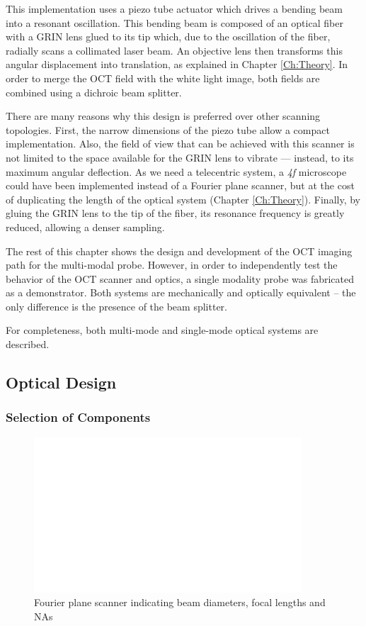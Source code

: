 This implementation uses a piezo tube actuator which drives a bending beam into a resonant oscillation. This bending beam is composed of an optical fiber with a GRIN lens glued to its tip which, due to the oscillation of the fiber, radially scans a collimated laser beam. An objective lens then transforms this angular displacement into translation, as explained in Chapter \ref{Ch:Theory}. In order to merge the OCT field with the white light image, both fields are combined using a dichroic beam splitter.

There are many reasons why this design is preferred over other scanning topologies. First, the narrow dimensions of the piezo tube allow a compact implementation. Also, the field of view that can be achieved with this scanner is not limited to the space available for the GRIN lens to vibrate --- instead, to its maximum angular deflection. As we need a telecentric system, a \textit{4f} microscope could have been implemented instead of a Fourier plane scanner, but at the cost of duplicating the length of the optical system (Chapter \ref{Ch:Theory}). Finally, by gluing the GRIN lens to the tip of the fiber, its resonance frequency is greatly reduced, allowing a denser sampling.


The rest of this chapter shows the design and development of the OCT imaging path for the multi-modal probe. However, in order to independently test the behavior of the OCT scanner and optics, a single modality probe was fabricated as a demonstrator. Both systems are mechanically and optically equivalent -- the only difference is the presence of the beam splitter. 

For completeness, both multi-mode and single-mode optical systems are described.


\newpage
\subsection{Optical Design}

\subsubsection{Selection of Components}
\begin{figure}[h!]\centering \includegraphics[width=10cm,draft]{figures/foo.png}
      \caption{Fourier plane scanner indicating beam diameters, focal lengths and NAs}
\end{figure}

